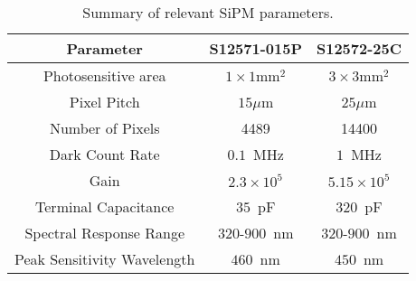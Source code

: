 \begin{table}[!ht]
\begin{center}
\caption{Summary of relevant SiPM parameters.}
\label{tab:SiPMParameters}
\begin{tabular}{|c|c|c|}
\hline
Parameter & S12571-015P & S12572-25C\\
\hline
Photosensitive area & $1\times1\mathrm{mm}^{2}$ & $3\times3\mathrm{mm}^{2}$\\
Pixel Pitch               & $15\mu$m                             & $25\mu$m\\
Number of Pixels    &  4489                                      & 14400                       \\
Dark Count Rate     &  $0.1$~MHz                            & $1$~MHz                  \\
Gain                       & $2.3\times10^{5}$                  & $5.15\times10^{5}$  \\
Terminal Capacitance  & $35$~pF                            & $320$~pF                  \\
Spectral Response Range & $320$-$900$~nm         & $320$-$900$~nm     \\
Peak Sensitivity Wavelength & $460$~nm                 & $450$~nm                 \\         
\hline
\end{tabular}
\end{center}
\end{table}